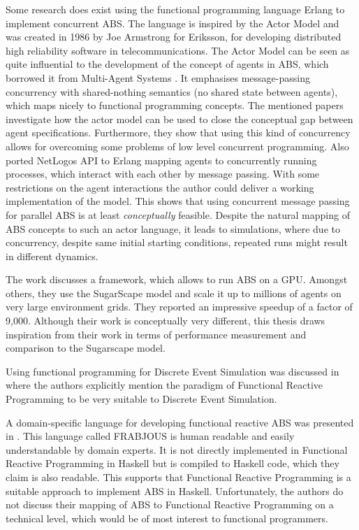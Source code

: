 Some research does exist \cite{di_stefano_using_2005, sher_agent-based_2013, varela_modelling_2004} using the functional programming language Erlang \cite{armstrong_erlang_2010} to implement concurrent ABS. The language is inspired by the Actor Model \cite{agha_actors:_1986} and was created in 1986 by Joe Armstrong for Eriksson, for developing distributed high reliability software in telecommunications. The Actor Model can be seen as quite influential to the development of the concept of agents in ABS, which borrowed it from Multi-Agent Systems \cite{wooldridge_introduction_2009}. It emphasises message-passing concurrency with shared-nothing semantics (no shared state between agents), which maps nicely to functional programming concepts. The mentioned papers investigate how the actor model can be used to close the conceptual gap between agent specifications. Furthermore, they show that using this kind of concurrency allows for overcoming some problems of low level concurrent programming.
Also \cite{bezirgiannis_improving_2013} ported NetLogos API to Erlang mapping agents to concurrently running processes, which interact with each other by message passing. With some restrictions on the agent interactions the author could deliver a working implementation of the model. This shows that using concurrent message passing for parallel ABS is at least \textit{conceptually} feasible. Despite the natural mapping of ABS concepts to such an actor language, it leads to simulations, where due to concurrency, despite same initial starting conditions, repeated runs might result in different dynamics.

The work \cite{lysenko_framework_2008} discusses a framework, which allows to run ABS on a GPU. Amongst others, they use the SugarScape model \cite{epstein_growing_1996} and scale it up to millions of agents on very large environment grids. They reported an impressive speedup of a factor of 9,000. Although their work is conceptually very different, this thesis draws inspiration from their work in terms of performance measurement and comparison to the Sugarscape model.

Using functional programming for Discrete Event Simulation was discussed in \cite{jankovic_functional_2007} where the authors explicitly mention the paradigm of Functional Reactive Programming to be very suitable to Discrete Event Simulation.

A domain-specific language for developing functional reactive ABS was presented in \cite{schneider_towards_2012,vendrov_frabjous_2014}. This language called FRABJOUS is human readable and easily understandable by domain experts. It is not directly implemented in Functional Reactive Programming in Haskell but is compiled to Haskell code, which they claim is also readable. This supports that Functional Reactive Programming is a suitable approach to implement ABS in Haskell. Unfortunately, the authors do not discuss their mapping of ABS to Functional Reactive Programming on a technical level, which would be of most interest to functional programmers.

